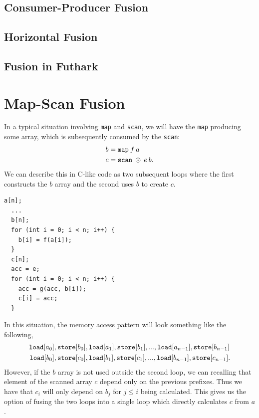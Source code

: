 \documentclass[11pt]{article}
\begin{document}
\subsection{Consumer-Producer Fusion}

\subsection{Horizontal Fusion}

\subsection{Fusion in Futhark}

\section{Map-Scan Fusion}
In a typical situation involving \texttt{map} and \texttt{scan}, we will have the \texttt{map} producing some array, which is subsequently
 consumed by the \texttt{scan}:
\begin{align*}
  b &= \mathtt{map} \: f \: a \\
  c &= \mathtt{scan} \: \odot \: e \: b\mathnormal{.}
\end{align*}
We can describe this in C-like code as two subsequent loops where the first constructs the $b$ array and the second uses $b$ to create $c$.
\begin{lstlisting}[caption=\texttt{map} and \texttt{scan} in C-like code.]
  a[n];
  ...
  b[n];
  for (int i = 0; i < n; i++) {
    b[i] = f(a[i]);
  }
  c[n];
  acc = e;
  for (int i = 0; i < n; i++) {
    acc = g(acc, b[i]);
    c[i] = acc;
  }
\end{lstlisting}
In this situation, the memory access pattern will look something like the following,
\begin{align*}
  \mathtt{load}[a_0]&, \mathtt{store}[b_0], \mathtt{load}[a_1], \mathtt{store}[b_1], ..., \mathtt{load}[a_{n-1}], \mathtt{store}[b_{n-1}] \\
  \mathtt{load}[b_0]&, \mathtt{store}[c_0], \mathtt{load}[b_1], \mathtt{store}[c_1], ..., \mathtt{load}[b_{n-1}], \mathtt{store}[c_{n-1}]\mathnormal{.}
\end{align*}
However, if the $b$ array is not used outside the second loop, we can recalling that element of the scanned array $c$ depend only on the previous prefixes. 
Thus we have that $c_i$ will only depend on $b_j$ for $j \leq i$ being calculated. This gives us the option of fusing the two loops into a single loop which directly calculates $c$ from $a$.
\end{document}
